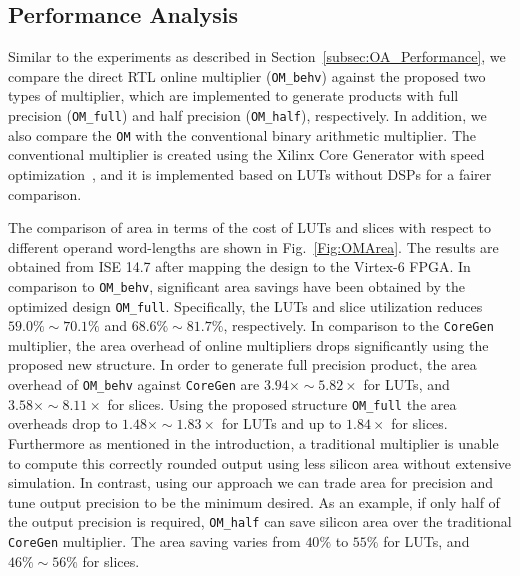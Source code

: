 \documentclass[conference]{IEEEtran}
\begin{document}
\subsection{Performance Analysis}
Similar to the experiments as described in Section~\ref{subsec:OA_Performance}, we compare the direct RTL online multiplier (\texttt{OM\_behv}) against the proposed two types of multiplier, which are implemented to generate products with full precision (\texttt{OM\_full}) and half precision (\texttt{OM\_half}), respectively. In addition, we also compare the \texttt{OM} with the conventional binary arithmetic multiplier. The conventional multiplier is created using the Xilinx Core Generator with speed optimization~\cite{XilinxMult}, and it is implemented based on LUTs without DSPs for a fairer comparison.

The comparison of area in terms of the cost of LUTs and slices with respect to different operand word-lengths are shown in Fig.~\ref{Fig:OMArea}. The results are obtained from ISE 14.7 after mapping the design to the Virtex-6 FPGA. In comparison to \texttt{OM\_behv}, significant area savings have been obtained by the optimized design \texttt{OM\_full}. Specifically, the LUTs and slice utilization reduces $59.0\%\sim70.1\%$ and $68.6\%\sim81.7\%$, respectively. In comparison to the \texttt{CoreGen} multiplier, the area overhead of online multipliers drops significantly using the proposed new structure. In order to generate full precision product, the area overhead of \texttt{OM\_behv} against \texttt{CoreGen} are $3.94\times\sim5.82\times$ for LUTs, and $3.58\times\sim8.11\times$ for slices. Using the proposed structure \texttt{OM\_full} the area overheads drop to $1.48\times\sim1.83\times$ for LUTs and up to $1.84\times$ for slices. Furthermore as mentioned in the introduction, a traditional multiplier is unable to compute this correctly rounded output using less silicon area without extensive simulation. In contrast, using our approach we can trade area for precision and tune output precision to be the minimum desired. As an example, if only half of the output precision is required, \texttt{OM\_half} can save silicon area over the traditional \texttt{CoreGen} multiplier. The area saving varies from $40\%$ to $55\%$ for LUTs, and $46\%\sim56\%$ for slices.

\end{document}
